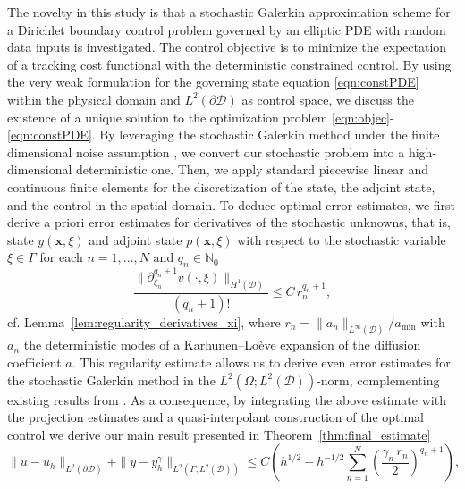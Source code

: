 \documentclass[a4paper,10pt]{article}
\newcommand{\bx}{{\boldsymbol{x}}}
\newcommand{\cD}{{\mathcal{D}}}
\numberwithin{theorem}{section}
\begin{document}
The novelty in this study is that a stochastic Galerkin approximation scheme for a Dirichlet boundary control problem governed by an elliptic PDE  with random data inputs is investigated. The control objective is to minimize the expectation of a tracking cost functional with the deterministic constrained control. By using the very weak formulation \cite{ECasas_JPRaymond_2006b,KDeckelnick_AGunther_MHinze_2009} for the governing state equation \eqref{eqn:constPDE} within the physical domain and $L^2(\partial \cD)$ as control space, we  discuss the existence of a unique solution to the optimization problem \eqref{eqn:objec}-\eqref{eqn:constPDE}.  By leveraging the stochastic Galerkin method under the  finite dimensional noise assumption \cite{NWiener_1938a}, we convert our stochastic problem into a high-dimensional deterministic one. Then, we apply standard piecewise linear and continuous finite elements  for the discretization of the state, the adjoint state, and the control in the spatial domain. To deduce optimal error estimates, we first derive a priori error estimates for derivatives of the stochastic unknowns, that is, state $y(\bx, \xi)$ and adjoint state $p(\bx, \xi)$  with respect to the stochastic variable $\xi\in \Gamma$ for each $n=1,\ldots,N$ and $q_n\in \mathbb N_0$
\[
    \frac{\|\partial_{\xi_n}^{q_n+1} v(\cdot,\xi)\|_{H^1(\cD)}}{(q_n + 1)!}
     \leq C\,r_n^{q_n+1},
\]
cf. Lemma~\ref{lem:regularity_derivatives_xi}, where $r_n = \|a_n\|_{L^\infty( \cD)}/a_{\min}$ with $a_n$ the deterministic modes of a Karhunen--Lo\`{e}ve expansion of the diffusion coefficient $a$. This regularity estimate allows us to derive even error estimates for the stochastic Galerkin method in the $L^2(\Omega;L^2(\cD))$-norm, complementing existing results from \cite{IBabuska_RTempone_GEZouraris_2004a}. As a consequence, by integrating the above estimate with the projection estimates and a quasi-interpolant construction of the optimal control \cite{TApel_MMateos_JPfefferer_ARosch_2018,ECasas_JPRaymond_2006b} we derive our main result presented in Theorem~\ref{thm:final_estimate}
\[
  \|u-u_h\|_{L^2(\partial \cD)} + \|y-y_h^\gamma\|_{L^2(\Gamma;L^2(\cD))}\le C\left(h^{1/2}
  +  h^{-1/2}\sum \limits_{n=1}^N \left(\frac{\gamma_n\,r_n}{2}\right)^{q_n+1}
  \right),
\]
\end{document}
